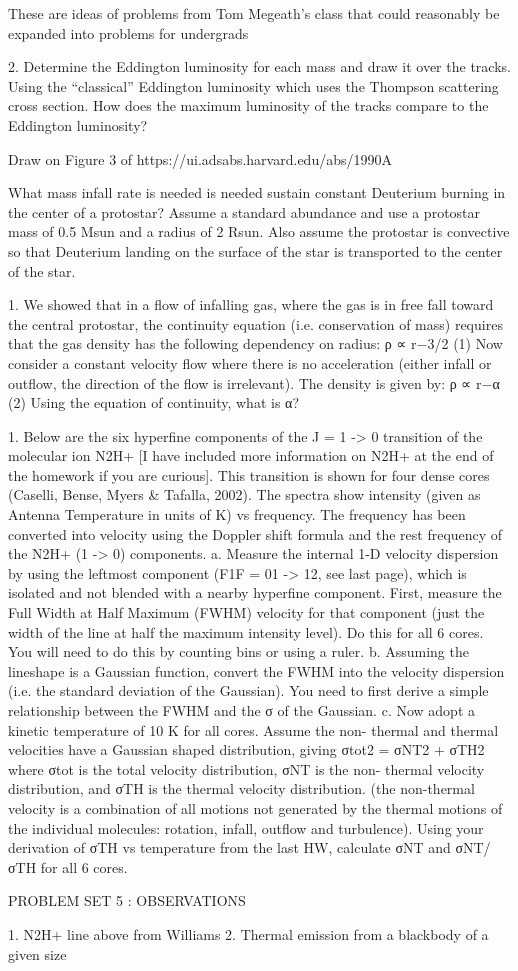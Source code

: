 
These are ideas of problems from Tom Megeath's class that could reasonably be expanded into problems for undergrads

2. Determine the Eddington luminosity for each mass and draw it over the
tracks. Using the “classical” Eddington luminosity which uses the Thompson
scattering cross section. How does the maximum luminosity of the tracks compare
to the Eddington luminosity?

Draw on Figure 3 of https://ui.adsabs.harvard.edu/abs/1990A%


What mass infall rate is needed is needed sustain constant Deuterium burning in
the center of a protostar? Assume a standard abundance and use a protostar mass
of 0.5 Msun and a radius of 2 Rsun. Also assume the protostar is convective so
that Deuterium landing on the surface of the star is transported to the center
of the star.




1. We showed that in a flow of infalling gas, where the gas is in free fall toward the central protostar, the continuity equation (i.e. conservation of mass) requires that the gas density has the following dependency on radius:
ρ ∝ r−3/2 (1) Now consider a constant velocity flow where there is no acceleration (either infall or outflow,
the direction of the flow is irrelevant). The density is given by:
ρ ∝ r−α (2)
Using the equation of continuity, what is α?



1. Below are the six hyperfine components of the J = 1 -> 0 transition of the molecular ion N2H+ [I have included more information on N2H+ at the end of the homework if you are curious]. This transition is shown for four dense cores (Caselli, Bense, Myers & Tafalla, 2002). The spectra show intensity (given as Antenna Temperature in units of K) vs frequency. The frequency has been converted into velocity using the Doppler shift formula and the rest frequency of the N2H+ (1 -> 0) components.
a. Measure the internal 1-D velocity dispersion by using the leftmost component (F1F = 01 -> 12, see last page), which is isolated and not blended with a nearby hyperfine component. First, measure the Full Width at Half Maximum (FWHM) velocity for that component (just the width of the line at half the maximum intensity level). Do this for all 6 cores. You will need to do this by counting bins or using a ruler.
b. Assuming the lineshape is a Gaussian function, convert the FWHM into the velocity dispersion (i.e. the standard deviation of the Gaussian). You need to first derive a simple relationship between the FWHM and the σ of the Gaussian.
c. Now adopt a kinetic temperature of 10 K for all cores. Assume the non- thermal and thermal velocities have a Gaussian shaped distribution, giving σtot2 = σNT2 + σTH2 where σtot is the total velocity distribution, σNT is the non- thermal velocity distribution, and σTH is the thermal velocity distribution. (the non-thermal velocity is a combination of all motions not generated by the thermal motions of the individual molecules: rotation, infall, outflow and turbulence). Using your derivation of σTH vs temperature from the last HW, calculate σNT and σNT/ σTH for all 6 cores.




PROBLEM SET 5 : OBSERVATIONS


1. N2H+ line above from Williams
2. Thermal emission from a blackbody of a given size
